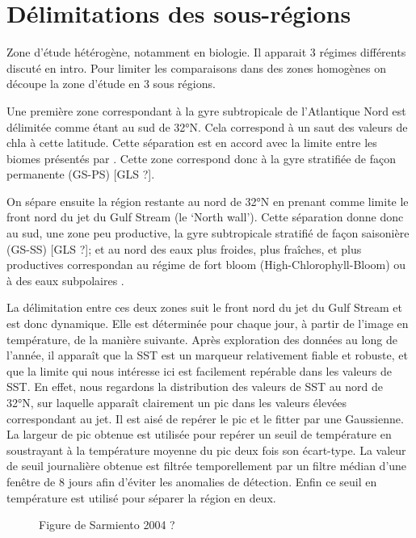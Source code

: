 \documentclass[index]{subfiles}
\begin{document}
\section{Délimitations des sous-régions}

Zone d'étude hétérogène, notamment en biologie.
Il apparait 3 régimes différents discuté en intro.
Pour limiter les comparaisons dans des zones homogènes on découpe la zone d'étude en 3 sous régions.

Une première zone correspondant à la gyre subtropicale de l'Atlantique Nord est délimitée comme étant au sud de 32°N.
Cela correspond à un saut des valeurs de \gls{chla} à cette latitude.
Cette séparation est en accord avec la limite entre les biomes présentés par \cite{sarmiento_2004}.
Cette zone correspond donc à la gyre stratifiée de façon permanente (GS-PS) [GLS ?].

On sépare ensuite la région restante au nord de 32°N en prenant comme limite le front nord du jet du Gulf Stream (le `North wall'). Cette séparation donne donc au sud, une zone peu productive, la gyre subtropicale stratifié de façon saisonière (GS-SS) [GLS ?]; et au nord des eaux plus froides, plus fraîches, et plus productives correspondan au régime de fort bloom (High-Chlorophyll-Bloom)  ou à des eaux subpolaires .

La délimitation entre ces deux zones suit le front nord du jet du Gulf Stream et est donc dynamique. Elle est déterminée pour chaque jour, à partir de l'image en température, de la manière suivante.
Après exploration des données au long de l'année, il apparaît que la SST est un marqueur relativement fiable et robuste, et que la limite qui nous intéresse ici est facilement repérable dans les valeurs de SST.
En effet, nous regardons la distribution des valeurs de SST au nord de 32°N, sur laquelle apparaît clairement un pic dans les valeurs élevées correspondant au jet.
Il est aisé de repérer le pic et le fitter par une Gaussienne. La largeur de pic obtenue est utilisée pour repérer un seuil de température en soustrayant à la température moyenne du pic deux fois son écart-type.
La valeur de seuil journalière obtenue est filtrée temporellement par un filtre médian d'une fenêtre de 8 jours afin d'éviter les anomalies de détection.
Enfin ce seuil en température est utilisé pour séparer la région en deux.

\begin{figure}
  \caption{Figure de Sarmiento 2004 ?}
  \label{fig:sarmiento}
\end{figure}
\end{document}
